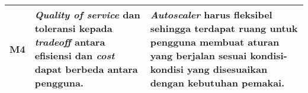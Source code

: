 \begin{table}[h]
\begin{center}
\begin{tabular}{|c|p{2.5in}|p{2.5in}|}
            M4 & \textit{Quality of service} dan toleransi kepada \textit{tradeoff} antara efisiensi dan \textit{cost} dapat berbeda antara pengguna. &
            \textit{Autoscaler} harus fleksibel sehingga terdapat ruang untuk pengguna membuat aturan yang berjalan sesuai kondisi-kondisi yang disesuaikan dengan kebutuhan pemakai.\tabularnewline

            \hline
        \end{tabular}
    \end{center}
    \label{tab:pemetaan-masalah}
\end{table}

